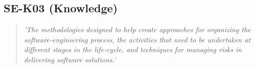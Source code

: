 \subsection{SE-K03 (Knowledge)}

  \begin{quote}
    \textit{'The methodologies designed to help create
    approaches for organizing the software-engineering
    process, the activities that need to be undertaken at
    different stages in the life-cycle, and techniques for
    managing risks in delivering software solutions.'}
  \end{quote}

\newpage